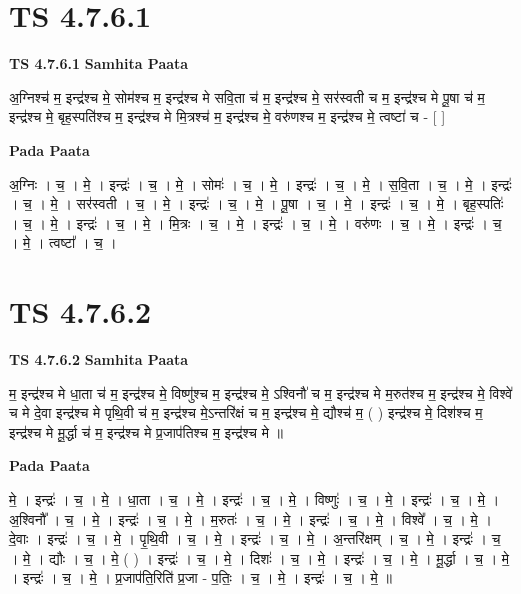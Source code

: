 \documentclass[17pt]{extarticle}
\begin{document}

\section{ TS 4.7.6.1 }

\textbf{TS 4.7.6.1 } \newline
\textbf{Samhita Paata} \newline

अ॒ग्निश्च॑ म॒ इन्द्र॑श्च मे॒ सोम॑श्च म॒ इन्द्र॑श्च मे सवि॒ता च॑ म॒ इन्द्र॑श्च मे॒ सर॑स्वती च म॒ इन्द्र॑श्च मे पू॒षा च॑ म॒ इन्द्र॑श्च मे॒ बृह॒स्पति॑श्च म॒ इन्द्र॑श्च मे मि॒त्रश्च॑ म॒ इन्द्र॑श्च मे॒ वरु॑णश्च म॒ इन्द्र॑श्च मे॒ त्वष्टा॑ च - [  ] \newline

\textbf{Pada Paata} \newline

अ॒ग्निः । च॒ । मे॒ । इन्द्रः॑ । च॒ । मे॒ । सोमः॑ । च॒ । मे॒ । इन्द्रः॑ । च॒ । मे॒ । स॒वि॒ता । च॒ । मे॒ । इन्द्रः॑ । च॒ । मे॒ । सर॑स्वती । च॒ । मे॒ । इन्द्रः॑ । च॒ । मे॒ । पू॒षा । च॒ । मे॒ । इन्द्रः॑ । च॒ । मे॒ । बृह॒स्पतिः॑ । च॒ । मे॒ । इन्द्रः॑ । च॒ । मे॒ । मि॒त्रः । च॒ । मे॒ । इन्द्रः॑ । च॒ । मे॒ । वरु॑णः । च॒ । मे॒ । इन्द्रः॑ । च॒ । मे॒ । त्वष्टा᳚ । च॒ ।  \newline





\section{ TS 4.7.6.2 }

\textbf{TS 4.7.6.2 } \newline
\textbf{Samhita Paata} \newline

म॒ इन्द्र॑श्च मे धा॒ता च॑ म॒ इन्द्र॑श्च मे॒ विष्णु॑श्च म॒ इन्द्र॑श्च मे॒ ऽश्विनौ॑ च म॒ इन्द्र॑श्च मे म॒रुत॑श्च म॒ इन्द्र॑श्च मे॒ विश्वे॑ च मे दे॒वा इन्द्र॑श्च मे   पृथि॒वी च॑ म॒ इन्द्र॑श्च मे॒ऽन्तरि॑क्षं च म॒ इन्द्र॑श्च मे॒ द्यौश्च॑ म॒ ( ) इन्द्र॑श्च मे॒ दिश॑श्च म॒ इन्द्र॑श्च मे                मू॒र्द्धा च॑ म॒ इन्द्र॑श्च मे प्र॒जाप॑तिश्च म॒ इन्द्र॑श्च मे ॥ \newline

\textbf{Pada Paata} \newline

मे॒ । इन्द्रः॑ । च॒ । मे॒ । धा॒ता । च॒ । मे॒ । इन्द्रः॑ । च॒ । मे॒ । विष्णुः॑ । च॒ । मे॒ । इन्द्रः॑ । च॒ । मे॒ । अ॒श्विनौ᳚ । च॒ । मे॒ । इन्द्रः॑ । च॒ । मे॒ । म॒रुतः॑ । च॒ । मे॒ । इन्द्रः॑ । च॒ । मे॒ । विश्वे᳚ । च॒ । मे॒ । दे॒वाः । इन्द्रः॑ । च॒ । मे॒ । पृ॒थि॒वी । च॒ । मे॒ । इन्द्रः॑ । च॒ । मे॒ । अ॒न्तरि॑क्षम् । च॒ । मे॒ । इन्द्रः॑ । च॒ । मे॒ । द्यौः । च॒ । मे॒ ( ) । इन्द्रः॑ । च॒ । मे॒ । दिशः॑ । च॒ । मे॒ । इन्द्रः॑ । च॒ । मे॒ । मू॒र्द्धा । च॒ । मे॒ । इन्द्रः॑ । च॒ । मे॒ । प्र॒जाप॑ति॒रिति॑ प्र॒जा - प॒तिः॒ । च॒ । मे॒ । इन्द्रः॑ । च॒ । मे॒ ॥  \newline
\end{document}
